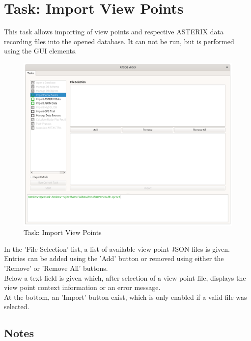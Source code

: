 \section{Task: Import View Points}
\label{sec:task_import_view_points} 

This task allows importing of view points and respective ASTERIX data recording files into the opened database. It can not be run, but is performed using the GUI elements. \\

\begin{figure}[H]
  \hspace*{-2.5cm}
    \includegraphics[width=19cm]{figures/view_point_import_task.png}
  \caption{Task: Import View Points}
\end{figure}

In the 'File Selection' list, a list of available view point JSON files is given. Entries can be added using the 'Add' button or removed using either the 'Remove' or 'Remove All' buttons. \\

Below a text field is given which, after selection of a view point file, displays the view point context information or an error message. \\

At the bottom, an 'Import' button exist, which is only enabled if a valid file was selected.

\subsection{Notes}

